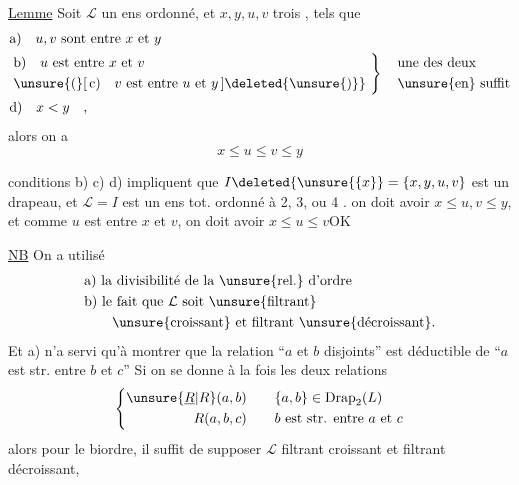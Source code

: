 \uline{Lemme} Soit $\mathcal L$ un ens ordonné, et $x,y,u,v$ trois , tels que
\[
\begin{aligned}
&\text{a)}\quad u,v\text{ sont entre }x\text{ et }y\\
&\left.\begin{aligned}
&\text{b)}\quad u\text{ est entre }x\text{ et }v\\
&\unsure{(}[\,\text{c)}\quad v\text{ est entre }u\text{ et }y\,]\deleted{\unsure{)}}
\end{aligned}\ \right\}\quad
\begin{aligned}&\text{une des deux}\\&\text{\unsure{en} suffit}\end{aligned}\\
&\text{d)}\quad x<y\quad,
\end{aligned}
\]
alors on a
\[
x\leq u\leq v\leq y
\]

\uline{}   conditions b)\unsure{,} c) d) impliquent que $I\deleted{\unsure{\{x}}=\{x,y,u,v\}$ est un drapeau,  et  $\mathcal L=I$ est un ens tot. ordonné  à 2, 3, ou 4 .
    on doit avoir $x\leq u,v\leq y$,  et comme $u$ est entre $x$ et $v$, on doit avoir $x\leq u\leq v$\quad OK

\uline{NB} On a utilisé
\[
\begin{aligned}
&\text{a) la divisibilité de la \unsure{rel.} d'ordre}\\
&\text{b) le fait que }\mathcal L\text{ soit \unsure{filtrant}}\\
&\hspace{2em}\text{\unsure{croissant} et filtrant \unsure{décroissant}.}
\end{aligned}
\]
Et a) n'a servi qu'à montrer que la relation ``$a$ et $b$ disjoints'' est déductible de ``$a$ est str. entre $b$ et $c$''
Si on se donne à la fois les deux relations
\[
\left\{\begin{aligned}
\unsure{\underline R|R}(a,b)&\qquad \{a,b\}\in\mathrm{Drap}_2(L)\\
R(a,b,c)&\qquad b\text{ est str. entre }a\text{ et }c
\end{aligned}\right.
\]
alors pour  le biordre, il suffit de supposer $\mathcal L$ filtrant croissant et filtrant décroissant,  

